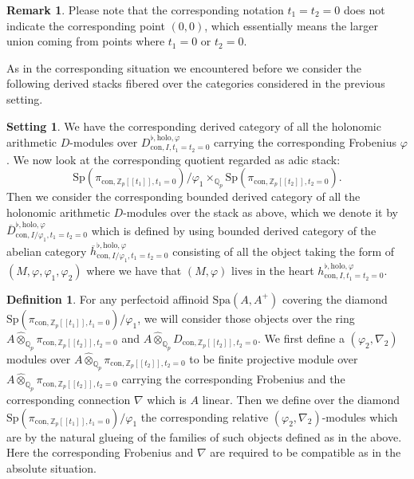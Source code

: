 \documentclass[11pt]{book}
\theoremstyle{definition}
\newtheorem{definition}[theorem]{Definition}
\newtheorem{remark}[theorem]{Remark}
\numberwithin{equation}{section}
\newtheorem{setting}[theorem]{Setting}
\begin{document}
\begin{remark}
Please note that the corresponding notation $t_1=t_2=0$ does not indicate the corresponding point $(0,0)$, which essentially means the larger union coming from points where $t_1=0$ or $t_2=0$.	
\end{remark}



\indent As in the corresponding situation we encountered before we consider the following derived stacks fibered over the categories considered in the previous setting.


\begin{setting}
We have the corresponding derived category of all the holonomic arithmetic $D$-modules over $D_{\mathrm{con},I,t_1=t_2=0}^{\flat,\mathrm{holo},\varphi}$ carrying the corresponding Frobenius $\varphi$. We now look at the corresponding quotient regarded as adic stack:
\begin{displaymath}
\mathrm{Sp}(\pi_{\mathrm{con},\mathbb{Z}_p[[t_1]],t_1=0})/\varphi_1\times_{\mathbb{Q}_p}\mathrm{Sp}(\pi_{\mathrm{con},\mathbb{Z}_p[[t_2]],t_2=0}).	
\end{displaymath}
Then we consider the corresponding bounded derived category of all the holonomic arithmetic $D$-modules over the stack as above, which we denote it by $\overline{D}_{\mathrm{con},I/\varphi_1,t_1=t_2=0}^{\flat,\mathrm{holo},\varphi}$ which is defined by using bounded derived category of the abelian category $\overline{h}_{\mathrm{con},I/\varphi_1,t_1=t_2=0}^{\flat,\mathrm{holo},\varphi}$ consisting of all the object taking the form of $(M,\varphi,\varphi_1,\varphi_2)$ where we have that $(M,\varphi)$ lives in the heart $h_{\mathrm{con},I,t_1=t_2=0}^{\flat,\mathrm{holo},\varphi}$.
	
\end{setting}



\begin{definition}
For any perfectoid affinoid $\mathrm{Spa}(A,A^+)$ covering the diamond $\mathrm{Sp}(\pi_{\mathrm{con},\mathbb{Z}_p[[t_1]],t_1=0})/\varphi_1$, we will consider those objects over the ring $A\widehat{\otimes}_{\mathbb{Q}_p}\pi_{\mathrm{con},\mathbb{Z}_p[[t_2]],t_2=0}$ and $A\widehat{\otimes}_{\mathbb{Q}_p}D_{\mathrm{con},\mathbb{Z}_p[[t_2]],t_2=0}$. We first define a $(\varphi_2,\nabla_2)$ modules over $A\widehat{\otimes}_{\mathbb{Q}_p}\pi_{\mathrm{con},\mathbb{Z}_p[[t_2]],t_2=0}$ to be finite projective module over $A\widehat{\otimes}_{\mathbb{Q}_p}\pi_{\mathrm{con},\mathbb{Z}_p[[t_2]],t_2=0}$ carrying the corresponding Frobenius and the corresponding connection $\nabla$   which is $A$ linear. Then we define over the diamond $\mathrm{Sp}(\pi_{\mathrm{con},\mathbb{Z}_p[[t_1]],t_1=0})/\varphi_1$ the corresponding relative $(\varphi_2,\nabla_2)$-modules which are by the natural glueing of the families of such objects defined as in the above. Here the corresponding Frobenius and $\nabla$ are required to be compatible as in the absolute situation.
\end{definition}
\end{document}
